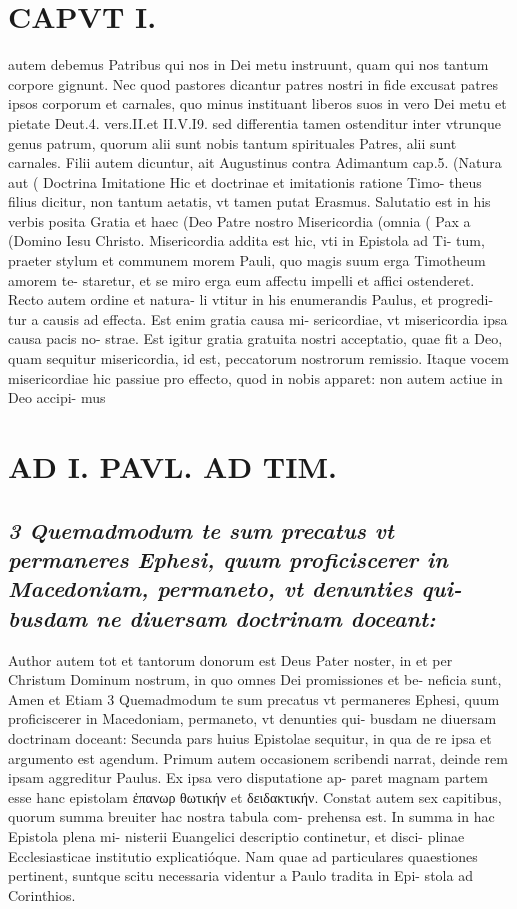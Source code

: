 \documentclass{article}
\begin{document}
\begin{pages}
\section*{CAPVT  I. }
\marginpar{[ p.5 ]}\pstart autem debemus Patribus qui nos in Dei metu instruunt, quam qui nos tantum corpore gignunt. Nec quod pastores dicantur patres nostri in fide excusat patres ipsos corporum et carnales, quo minus instituant liberos suos in vero Dei metu et pietate Deut.4. vers.II.et II.V.I9. sed differentia tamen ostenditur inter vtrunque genus patrum, quorum alii sunt nobis tantum spirituales Patres, alii sunt carnales. Filii autem dicuntur, ait Augustinus contra Adimantum cap.5. (Natura aut ( Doctrina Imitatione Hic et doctrinae et imitationis ratione Timo- theus filius dicitur, non tantum aetatis, vt tamen putat Erasmus. Salutatio est in his verbis posita Gratia et haec (Deo Patre nostro Misericordia (omnia ( Pax a (Domino Iesu Christo. Misericordia addita est hic, vti in Epistola ad Ti- tum, praeter stylum et communem morem Pauli, quo magis suum erga Timotheum amorem te- staretur, et se miro erga eum affectu impelli et affici ostenderet. Recto autem ordine et natura- li vtitur in his enumerandis Paulus, et progredi- tur a causis ad effecta. Est enim gratia causa mi- sericordiae, vt misericordia ipsa causa pacis no- strae. Est igitur gratia gratuita nostri acceptatio, quae fit a Deo, quam sequitur misericordia, id est, peccatorum nostrorum remissio. Itaque vocem misericordiae hic passiue pro effecto, quod in nobis apparet: non autem actiue in Deo accipi- mus  \pend
\section*{AD I. PAVL. AD TIM. }
\marginpar{[ p.6 ]}\pstart {}
{}
\subsection*{\textit{3 Quemadmodum te sum precatus vt permaneres Ephesi, quum proficiscerer in Macedoniam, permaneto, vt denunties qui- busdam ne diuersam doctrinam doceant:}}Author autem tot et tantorum donorum est Deus Pater noster, in et per Christum Dominum nostrum, in quo omnes Dei promissiones et be- neficia sunt, Amen et Etiam 3 Quemadmodum te sum precatus vt permaneres Ephesi, quum proficiscerer in Macedoniam, permaneto, vt denunties qui- busdam ne diuersam doctrinam doceant: Secunda pars huius Epistolae sequitur, in qua de re ipsa et argumento est agendum. Primum autem occasionem scribendi narrat, deinde rem ipsam aggreditur Paulus. Ex ipsa vero disputatione ap- paret magnam partem esse hanc epistolam ἐπανωρ θωτικήν et δειδακτικήν. Constat autem sex capitibus, quorum summa breuiter hac nostra tabula com- prehensa est. In summa in hac Epistola plena mi- nisterii Euangelici descriptio continetur, et disci- plinae Ecclesiasticae institutio explicatióque. Nam quae ad particulares quaestiones pertinent, suntque scitu necessaria videntur a Paulo tradita in Epi- stola ad Corinthios.  \pend

\end{pages}
\end{document}
